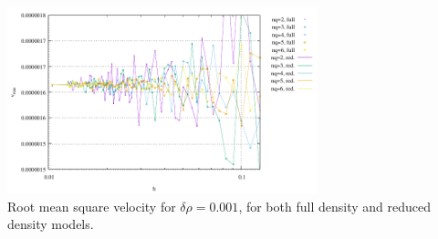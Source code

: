 \begin{center}
\includegraphics[width=9cm]{python_codes/fieldstone_80/results/sphere/vrms}\\
{\captionfont Root mean square velocity for $\delta \rho=0.001$, for both full density and reduced 
density models.}
\end{center}










